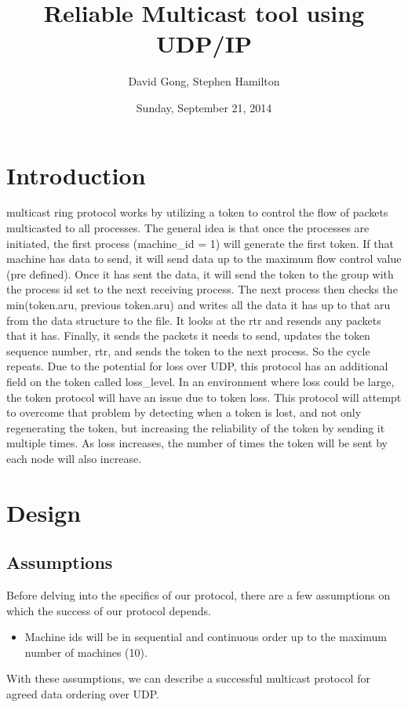 \documentclass[12pt,journal,compsoc]{IEEEtran}
\begin{document}
\title{Reliable Multicast tool using UDP/IP}
\author{David Gong, Stephen Hamilton}%
\date{Sunday, September 21, 2014}
\maketitle
\section{Introduction}
 multicast ring protocol works by utilizing a token to control the flow of packets multicasted to all processes. The general idea is that once the processes are initiated, the first process (machine\_id = 1) will generate the first token. If that machine has data to send, it will send data up to the maximum flow control value (pre defined). Once it has sent the data, it will send the token to the group with the process id set to the next receiving process. The next process then checks the min(token.aru, previous token.aru) and writes all the data it has up to that aru from the data structure to the file. It looks at the rtr and resends any packets that it has. Finally, it sends the packets it needs to send, updates the token sequence number, rtr, and sends the token to the next process. So the cycle repeats. Due to the potential for loss over UDP, this protocol has an additional field on the token called loss\_level. In an environment where loss could be large, the token protocol will have an issue due to token loss. This protocol will attempt to overcome that problem by detecting when a token is lost, and not only regenerating the token, but increasing the reliability of the token by sending it multiple times. As loss increases, the number of times the token will be sent by each node will also increase.
\section{Design}
\subsection{Assumptions}
Before delving into the specifics of our protocol, there are a few assumptions on which the success of our protocol depends.
\begin{itemize}
\item Machine ids will be in sequential and continuous order up to the maximum number of machines (10).
\end{itemize}
With these assumptions, we can describe a successful multicast protocol for agreed data ordering over UDP.
\end{document}
